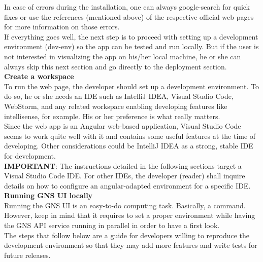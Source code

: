 In case of errors during the installation, one can always google-search for quick fixes or use the references (mentioned above) of the respective official web pages for more information on those errors.\\

If everything goes well, the next step is to proceed with setting up a development environment (dev-env) so the app can be tested and run locally. But if the user is not interested in visualizing the app on his/her local machine, he or she can always skip this next section and go directly to the deployment section.\\

\noindent
\textbf{Create a workspace }\\
To run the web page, the developer should set up a development environment. To do so, he or she needs an IDE such as IntelliJ IDEA, Visual Studio Code, WebStorm, and any related workspace enabling developing features like intellisense, for example. His or her preference is what really matters.\\

Since the web app is an Angular web-based application, Visual Studio Code seems to work quite well with it and contains some useful features at the time of developing. Other considerations could be IntelliJ IDEA as a strong, stable IDE for development.\\

\noindent
\textbf{IMPORTANT}: The instructions detailed in the following sections target a Visual Studio Code IDE. For other IDEs, the developer (reader) shall inquire details on how to configure an angular-adapted environment for a specific IDE.\\

\noindent
\textbf{Running GNS UI locally}\\
Running the GNS UI is an easy-to-do computing task. Basically, a command. However, keep in mind that it requires to set a proper environment while having the GNS API service running in parallel in order to have a first look.\\

The steps that follow below are a guide for developers willing to reproduce the development environment so that they may add more features and write tests for future releases.

